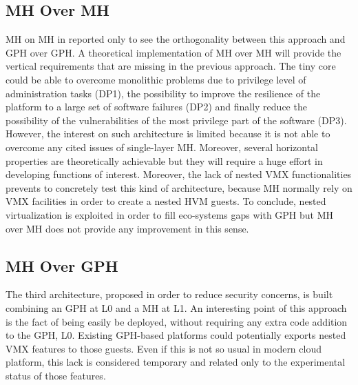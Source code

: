 \documentclass{sig-alternate}
\begin{document}

\subsection{MH Over MH}

MH on MH in reported only to see the orthogonality between this approach and GPH over GPH.
A theoretical implementation of MH over MH will provide the vertical requirements that are missing in the previous approach. The tiny core could be able to overcome monolithic problems due to privilege level of administration tasks (DP1), the possibility to improve the resilience of the platform to a large set of software failures (DP2) and finally reduce the possibility of the vulnerabilities of the most privilege part of the software (DP3). However, the interest on such architecture is limited because it is not able to overcome any cited issues of single-layer MH. Moreover, several horizontal properties are theoretically achievable but they will require a huge effort in developing functions of interest. Moreover, the lack of nested VMX functionalities prevents to concretely test this kind of architecture, because MH normally rely on VMX facilities in order to create a nested HVM guests.
To conclude, nested virtualization is exploited in order to fill eco-systems gaps with GPH but MH over MH does not provide any improvement in this sense.

\subsection{MH Over GPH}
\label{par:mog}

The third architecture, proposed in order to reduce security concerns, is built combining an GPH at L0 and a MH at L1. 
An interesting point of this approach is the fact of being easily be deployed, without requiring any extra code addition to the GPH, L0.  Existing GPH-based platforms could potentially exports nested VMX features to those guests. Even if this is not so usual in modern cloud platform, this lack is considered temporary and related only to the experimental status of those features.
\end{document}
